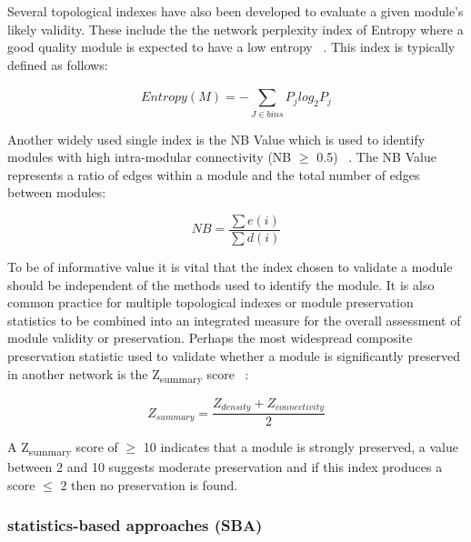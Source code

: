 Several topological indexes have also been developed to evaluate a given module's likely validity. These include the the network perplexity index of Entropy where a good quality module is expected to have a low entropy ~\autocite{Zha2009}. This index is typically defined as follows: 

\begin{equation}
Entropy (M) = -\textstyle \sum_{J \in {bins}}^{} P_j log_2 P_j
\end{equation}

Another widely used single index is the NB Value which is used to identify modules with high intra-modular connectivity (NB $\geq$ 0.5) ~\autocite{Oza2010}. The NB Value represents a ratio of edges within a module and the total number of edges between modules:

\begin{equation}
NB = \frac{\sum e(i)} {\sum d(i)} 
\end{equation}

To be of informative value it is vital that the index chosen to validate a module should be independent of the methods used to identify the module. It is also common practice for multiple topological indexes or module preservation statistics to be combined into an integrated measure for the overall assessment of module validity or preservation. Perhaps the most widespread composite preservation statistic used to validate whether a module is significantly preserved in another network is the Z\textsubscript{summary} score ~\autocite{Lan2011}: 

\begin{equation}
Z_{summary} = \frac{Z_{density} + Z_{connectivity}} {2} 
\end{equation}

A Z\textsubscript{summary} score of $\geq$ 10 indicates that a module is strongly preserved, a value between 2 and 10 suggests moderate preservation and if this index produces a score $\leq$ 2 then no preservation is found. 

\subsubsection{statistics-based approaches (SBA)}

